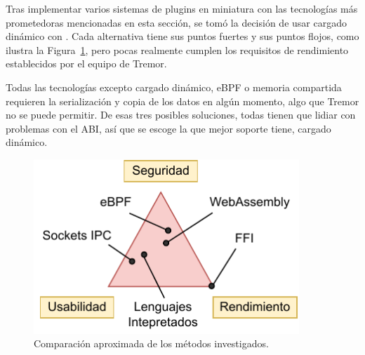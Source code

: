 Tras implementar varios sistemas de plugins en miniatura con las tecnologías más
prometedoras mencionadas en esta sección, se tomó la decisión de usar cargado
dinámico con \abistable. Cada alternativa tiene sus puntos fuertes y sus puntos
flojos, como ilustra la Figura~\ref{fig:triangle}, pero pocas realmente
cumplen los requisitos de rendimiento establecidos por el equipo de Tremor.

Todas las tecnologías excepto cargado dinámico, eBPF o memoria compartida
requieren la serialización y copia de los datos en algún momento, algo que
Tremor no se puede permitir. De esas tres posibles soluciones, todas tienen que
lidiar con problemas con el ABI, así que se escoge la que mejor soporte tiene,
cargado dinámico.

\begin{figure}
    \centering
    \includegraphics[width=10cm]{./Imagenes/triangle.pdf}
    \caption{Comparación aproximada de los métodos investigados.}%
    \label{fig:triangle}
\end{figure}
